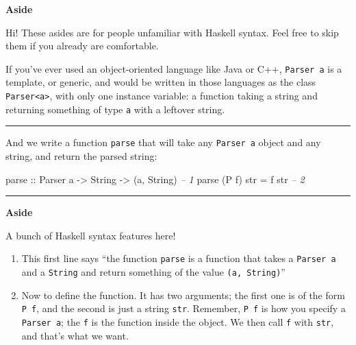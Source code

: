 \documentclass[]{article}
\newenvironment{Shaded}{}{}
\newcommand{\DataTypeTok}[1]{\textcolor[rgb]{0.56,0.13,0.00}{{#1}}}
\newcommand{\CommentTok}[1]{\textcolor[rgb]{0.38,0.63,0.69}{\textit{{#1}}}}
\newcommand{\OtherTok}[1]{\textcolor[rgb]{0.00,0.44,0.13}{{#1}}}
\newcommand{\FunctionTok}[1]{\textcolor[rgb]{0.02,0.16,0.49}{{#1}}}
\newcommand{\NormalTok}[1]{{#1}}
\begin{document}
\textbf{Aside}

Hi! These asides are for people unfamiliar with Haskell syntax. Feel
free to skip them if you already are comfortable.

If you've ever used an object-oriented language like Java or C++,
\texttt{Parser\ a} is a template, or generic, and would be written in
those languages as the class \texttt{Parser\textless{}a\textgreater{}},
with only one instance variable: a function taking a string and
returning something of type \texttt{a} with a leftover string.

\begin{center}\rule{0.5\linewidth}{\linethickness}\end{center}

And we write a function \texttt{parse} that will take any
\texttt{Parser\ a} object and any string, and return the parsed string:

\begin{Shaded}
\begin{Highlighting}[]
\OtherTok{parse ::} \DataTypeTok{Parser} \NormalTok{a }\OtherTok{->} \DataTypeTok{String} \OtherTok{->} \NormalTok{(a, }\DataTypeTok{String}\NormalTok{)              }\CommentTok{-- 1}
\NormalTok{parse (}\DataTypeTok{P} \NormalTok{f) str }\FunctionTok{=} \NormalTok{f str                                 }\CommentTok{-- 2}
\end{Highlighting}
\end{Shaded}

\begin{center}\rule{0.5\linewidth}{\linethickness}\end{center}

\textbf{Aside}

A bunch of Haskell syntax features here!

\begin{enumerate}
\def\labelenumi{\arabic{enumi}.}
\item
  This first line says ``the function \texttt{parse} is a function that
  takes a \texttt{Parser\ a} and a \texttt{String} and return something
  of the value \texttt{(a,\ String)}''
\item
  Now to define the function. It has two arguments; the first one is of
  the form \texttt{P\ f}, and the second is just a string \texttt{str}.
  Remember, \texttt{P\ f} is how you specify a \texttt{Parser\ a}; the
  \texttt{f} is the function inside the object. We then call \texttt{f}
  with \texttt{str}, and that's what we want.
\end{enumerate}
\end{document}
